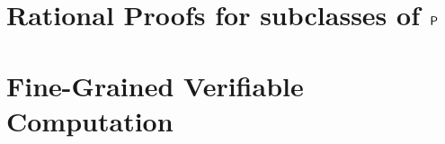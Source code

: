 \documentclass[nobib]{tufte-book}
\begin{document}

% 


\pagestyle{fancy}

\chapter{Rational Proofs for subclasses of $\P$}


\chapter{Fine-Grained Verifiable Computation}


\appendix


\end{document}
